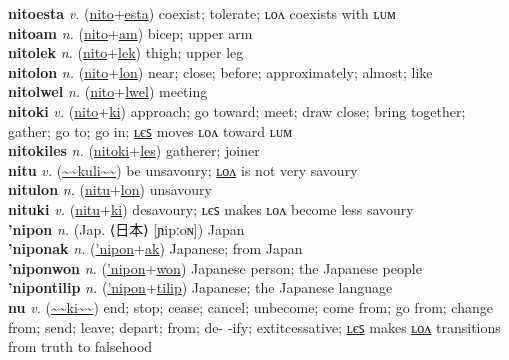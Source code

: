 \textbf{nitoesta} \textit{v.} (\hyperref[nito]{nito}+\hyperref[esta]{esta})
coexist; tolerate; ʟᴏᴧ coexists with ʟᴜᴍ \label{nitoesta} \\
\textbf{nitoam} \textit{n.} (\hyperref[nito]{nito}+\hyperref[am]{am})
bicep; upper arm \label{nitoam} \\
\textbf{nitolek} \textit{n.} (\hyperref[nito]{nito}+\hyperref[lek]{lek})
thigh; upper leg \label{nitolek} \\
\textbf{nitolon} \textit{n.} (\hyperref[nito]{nito}+\hyperref[lon]{lon})
near; close; before; approximately; almost; like \label{nitolon} \\
\textbf{nitolwel} \textit{n.} (\hyperref[nito]{nito}+\hyperref[lwel]{lwel})
meeting \label{nitolwel} \\
\textbf{nitoki} \textit{v.} (\hyperref[nito]{nito}+\hyperref[ki]{ki})
approach; go toward; meet; draw close; bring together; gather; go to; go in; \hyperref[nitokiles]{ʟєꜱ} moves ʟᴏᴧ toward ʟᴜᴍ \label{nitoki} \\
\textbf{nitokiles} \textit{n.} (\hyperref[nitoki]{nitoki}+\hyperref[les]{les})
gatherer; joiner \label{nitokiles} \\
\textbf{nitu} \textit{v.} (\hyperref[kuli]{\~{}\~{}kuli\~{}\~{}})
be unsavoury; \hyperref[nitulon]{ʟᴏᴧ} is not very savoury \label{nitu} \\
\textbf{nitulon} \textit{n.} (\hyperref[nitu]{nitu}+\hyperref[lon]{lon})
unsavoury \label{nitulon} \\
\textbf{nituki} \textit{v.} (\hyperref[nitu]{nitu}+\hyperref[ki]{ki})
desavoury; ʟєꜱ makes ʟᴏᴧ become less savoury \label{nituki} \\
\textbf{'nipon} \textit{n.} (Jap. ⟨日本⟩ [ɲipːoɴ])
Japan \label{'nipon} \\
\textbf{'niponak} \textit{n.} (\hyperref['nipon]{'nipon}+\hyperref[ak]{ak})
Japanese; from Japan \label{'niponak} \\
\textbf{'niponwon} \textit{n.} (\hyperref['nipon]{'nipon}+\hyperref[won]{won})
Japanese person; the Japanese people \label{'niponwon} \\
\textbf{'nipontilip} \textit{n.} (\hyperref['nipon]{'nipon}+\hyperref[tilip]{tilip})
Japanese; the Japanese language \label{'nipontilip} \\
\textbf{nu} \textit{v.} (\hyperref[ki]{\~{}\~{}ki\~{}\~{}})
end; stop; cease; cancel; unbecome; come from; go from; change from; send; leave; depart; from; de- -ify; 	extit{cessative}; \hyperref[nules]{ʟєꜱ} makes \hyperref[nulon]{ʟᴏᴧ} transitions from truth to falsehood \label{nu} \\
